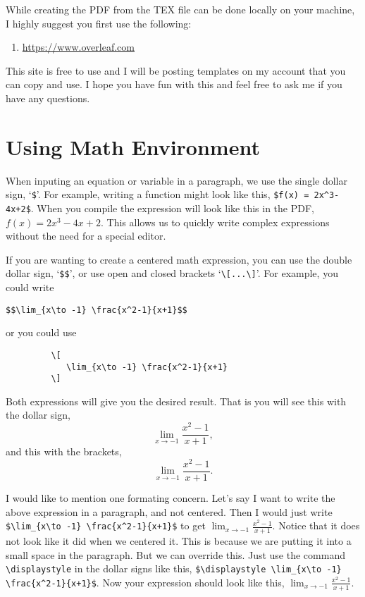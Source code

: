 \documentclass{amsart}
\begin{document}
   While creating the PDF from the TEX file can be done locally on your machine, I highly suggest you first use the following:
   \begin{enumerate}
      \item \url{https://www.overleaf.com}
   \end{enumerate}
   This site is free to use and I will be posting templates on my account that you can copy and use. I hope you have fun with this and feel free to ask me if you have any questions.



\section{Using Math Environment} \label{math} 


   When inputing an equation or variable in a paragraph, we use the single dollar sign, `\verb|$|'. For example, writing a function might look like this, \verb|$f(x) = 2x^3-4x+2$|. When you compile the expression will look like this in the PDF, $f(x) = 2x^3-4x+2$. This allows us to quickly write complex expressions without the need for a special editor.

   If you are wanting to create a centered math expression, you can use the double dollar sign, `\verb|$$|', or use open and closed brackets `\verb|\[...\]|'. For example, you could write
      \begin{center}
         \verb|$$\lim_{x\to -1} \frac{x^2-1}{x+1}$$|
      \end{center}
   or you could use
      \begin{center} 
         \begin{verbatim}
         \[
            \lim_{x\to -1} \frac{x^2-1}{x+1}
         \]         
         \end{verbatim}
      \end{center}
   Both expressions will give you the desired result.  That is you will see this with the dollar sign, 
   $$\lim_{x\to -1} \frac{x^2-1}{x+1},$$
   and this with the brackets,
      \[
          \lim_{x\to -1} \frac{x^2-1}{x+1}.
      \]     


   I would like to mention one formating concern. Let's say I want to write the above expression in a paragraph, and not centered. Then I would just write \verb|$\lim_{x\to -1} \frac{x^2-1}{x+1}$| to get $\lim_{x\to -1} \frac{x^2-1}{x+1}$. Notice that it does not look like it did when we centered it. This is because we are putting it into a small space in the paragraph. But we can override this. Just use the command \verb|\displaystyle| in the dollar signs like this, \verb|$\displaystyle \lim_{x\to -1} \frac{x^2-1}{x+1}$|. Now your expression should look like this, $\displaystyle \lim_{x\to -1} \frac{x^2-1}{x+1}$.
\end{document}

